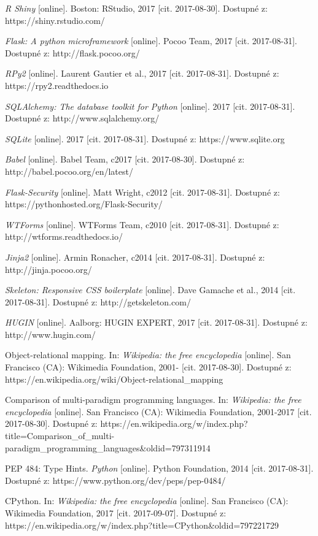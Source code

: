 \documentclass[a4paper,twoside,12pt]{scrbook}
\begin{document}
\begin{thebibliography}{99}
	 \textit{R Shiny} [online]. Boston: RStudio, 2017 [cit. 2017-08-30]. Dostupné z: https://shiny.rstudio.com/

	 \textit{Flask: A python microframework} [online]. Pocoo Team, 2017 [cit. 2017-08-31]. Dostupné z: http://flask.pocoo.org/

	 \textit{RPy2} [online]. Laurent Gautier et al., 2017 [cit. 2017-08-31]. Dostupné z: https://rpy2.readthedocs.io

	 \textit{SQLAlchemy: The database toolkit for Python} [online]. 2017 [cit. 2017-08-31]. Dostupné z: http://www.sqlalchemy.org/

	 \textit{SQLite} [online]. 2017 [cit. 2017-08-31]. Dostupné z: https://www.sqlite.org

	 \textit{Babel} [online]. Babel Team, c2017 [cit. 2017-08-30]. Dostupné z: http://babel.pocoo.org/en/latest/

	 \textit{Flask-Security} [online]. Matt Wright, c2012 [cit. 2017-08-31]. Dostupné z: https://pythonhosted.org/Flask-Security/

	 \textit{WTForms} [online]. WTForms Team, c2010 [cit. 2017-08-31]. Dostupné z: http://wtforms.readthedocs.io/

	 \textit{Jinja2} [online]. Armin Ronacher, c2014 [cit. 2017-08-31]. Dostupné z: http://jinja.pocoo.org/

	 \textit{Skeleton: Responsive CSS boilerplate} [online]. Dave Gamache et al., 2014 [cit. 2017-08-31]. Dostupné z: http://getskeleton.com/

	 \textit{HUGIN} [online]. Aalborg: HUGIN EXPERT, 2017 [cit. 2017-08-31]. Dostupné z: http://www.hugin.com/


	 Object-relational mapping. In: \textit{Wikipedia: the free encyclopedia} [online]. San Francisco (CA): Wikimedia Foundation, 2001- [cit. 2017-08-30]. Dostupné z: https://en.wikipedia.org/wiki/Object-relational\_mapping

	 Comparison of multi-paradigm programming languages. In: \textit{Wikipedia: the free encyclopedia} [online]. San Francisco (CA): Wikimedia Foundation, 2001-2017 [cit. 2017-08-30]. Dostupné z: https://en.wikipedia.org/w/index.php?title=Comparison\_of\_multi-paradigm\_programming\_languages\&oldid=797311914

	 PEP 484: Type Hints. \textit{Python} [online]. Python Foundation, 2014 [cit. 2017-08-31]. Dostupné z: https://www.python.org/dev/peps/pep-0484/

	 CPython. In: \textit{Wikipedia: the free encyclopedia} [online]. San Francisco (CA): Wikimedia Foundation, 2017 [cit. 2017-09-07]. Dostupné z: https://en.wikipedia.org/w/index.php?title=CPython\&oldid=797221729

\end{thebibliography}
\end{document}
